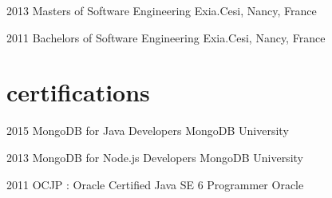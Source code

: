 \documentclass[]{friggeri-cv} %
\begin{document}
\begin{entrylist}


\entry
{2013}
{}
{Masters {\normalfont of Software Engineering}}
{}
{Exia.Cesi, Nancy, France}
{}


\entry
{2011}
{}
{Bachelors {\normalfont of Software Engineering}}
{}
{Exia.Cesi, Nancy, France}
{}


\end{entrylist}


\section{certifications}

\begin{entrylist}


\entry
{2015}
{}
{MongoDB for Java Developers}
{MongoDB University}
{}
{}

\entry
{2013}
{}
{MongoDB for Node.js Developers}
{MongoDB University}
{}
{}

\entry
{2011}
{}
{OCJP : Oracle Certified Java SE 6 Programmer}
{Oracle}
{}
{}


\end{entrylist}



\end{document}

